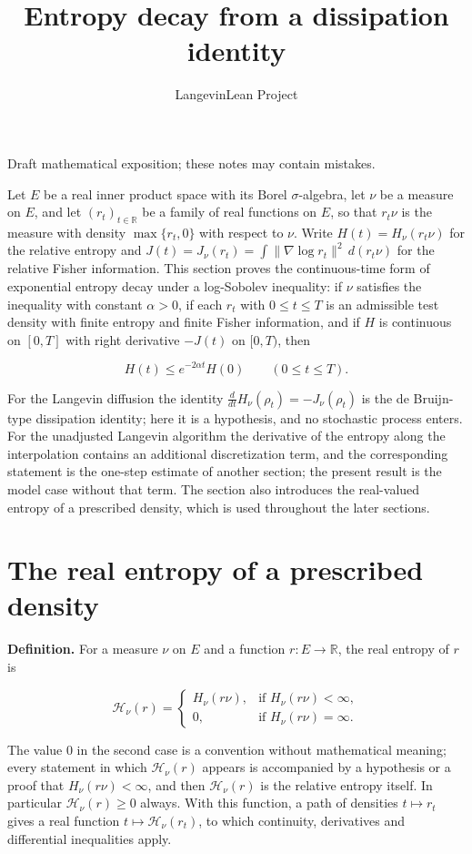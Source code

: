 \documentclass[11pt,a4paper]{article}
\title{\texorpdfstring{Entropy decay from a dissipation identity}{Entropy decay from a dissipation identity}}
\author{LangevinLean Project}
\date{}
\begin{document}
\maketitle
Draft mathematical exposition; these notes may contain mistakes.


Let \(E\) be a real inner product space with its Borel \(\sigma\)-algebra, let \(\nu\) be a measure on \(E\), and let \((r_t)_{t\in\mathbb R}\) be a family of real functions on \(E\), so that \(r_t\nu\) is the measure with density \(\max\{r_t,0\}\) with respect to \(\nu\). Write \(H(t)=H_\nu(r_t\nu)\) for the relative entropy and \(J(t)=J_\nu(r_t)=\int\|\nabla\log r_t\|^2\,d(r_t\nu)\) for the relative Fisher information. This section proves the continuous-time form of exponential entropy decay under a log-Sobolev inequality: if \(\nu\) satisfies the inequality with constant \(\alpha>0\), if each \(r_t\) with \(0\le t\le T\) is an admissible test density with finite entropy and finite Fisher information, and if \(H\) is continuous on \([0,T]\) with right derivative \(-J(t)\) on \([0,T)\), then


\[H(t)\le e^{-2\alpha t}H(0)\qquad(0\le t\le T).\]


For the Langevin diffusion the identity \(\frac{d}{dt}H_\nu(\rho_t)=-J_\nu(\rho_t)\) is the de Bruijn-type dissipation identity; here it is a hypothesis, and no stochastic process enters. For the unadjusted Langevin algorithm the derivative of the entropy along the interpolation contains an additional discretization term, and the corresponding statement is the one-step estimate of another section; the present result is the model case without that term. The section also introduces the real-valued entropy of a prescribed density, which is used throughout the later sections.


\section{\texorpdfstring{The real entropy of a prescribed density}{The real entropy of a prescribed density}}


\textbf{Definition.} For a measure \(\nu\) on \(E\) and a function \(r:E\to\mathbb R\), the real entropy of \(r\) is


\[\mathcal H_\nu(r)=\begin{cases}H_\nu(r\nu), & \text{if }H_\nu(r\nu)<\infty,\\ 0, & \text{if }H_\nu(r\nu)=\infty.\end{cases}\]


The value \(0\) in the second case is a convention without mathematical meaning; every statement in which \(\mathcal H_\nu(r)\) appears is accompanied by a hypothesis or a proof that \(H_\nu(r\nu)<\infty\), and then \(\mathcal H_\nu(r)\) is the relative entropy itself. In particular \(\mathcal H_\nu(r)\ge0\) always. With this function, a path of densities \(t\mapsto r_t\) gives a real function \(t\mapsto\mathcal H_\nu(r_t)\), to which continuity, derivatives and differential inequalities apply.
\end{document}
